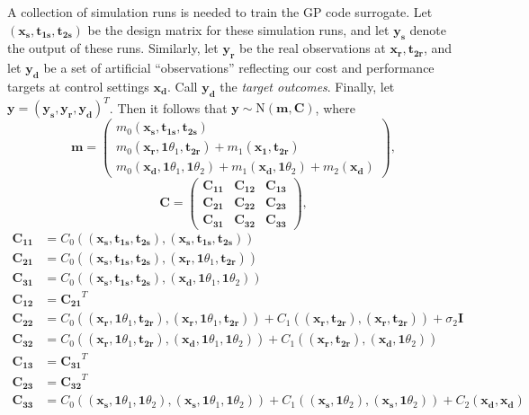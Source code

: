 \documentclass[12pt]{article}
\begin{document}
%
A collection of simulation runs is needed to train the GP code surrogate.
%
Let $(\mathbf{x_s},\mathbf{t_{1s}},\mathbf{t_{2s}})$ be the design matrix for these simulation runs, and let $\mathbf{y_s}$ denote the output of these runs.
%
Similarly, let $\mathbf{y_r}$ be the real observations at $\mathbf{x_r},\mathbf{t_{2r}}$, and let $\mathbf {y_d}$ be a set of artificial ``observations'' reflecting our cost and performance targets at control settings $\mathbf {x_d}$.
%
Call $\mathbf{y_d}$ the {\em target outcomes}.
%
Finally, let $\mathbf y = (\mathbf{y_s},\mathbf{y_r},\mathbf{y_d})^T$.
%
Then it follows that $\mathbf y\sim \mathrm{N}(\mathbf m,\mathbf C)$, where
\[
\mathbf m = \begin{pmatrix}
m_0(\mathbf{x_s},\mathbf{t_{1s}},\mathbf{t_{2s}})\\
m_0(\mathbf{x_r},\mathbf1\theta_1,\mathbf{t_{2r}}) + m_1(\mathbf{x_1},\mathbf{t_{2r}})\\
m_0(\mathbf{x_d},\mathbf1\theta_1,\mathbf1\theta_2) + m_1(\mathbf{x_d},\mathbf1\theta_2) + m_2(\mathbf{x_d})
\end{pmatrix},
\]
\[
\mathbf C = \begin{pmatrix}
\mathbf{C_{11}} & \mathbf{C_{12}} & \mathbf{C_{13}}\\
\mathbf{C_{21}} & \mathbf{C_{22}} & \mathbf{C_{23}}\\
\mathbf{C_{31}} & \mathbf{C_{32}} & \mathbf{C_{33}}
\end{pmatrix},
\]
\begin{align*}
\mathbf{C_{11}}&=C_0\left((\mathbf{x_s},\mathbf{t_{1s}},\mathbf{t_{2s}}),(\mathbf{x_s},\mathbf{t_{1s}},\mathbf{t_{2s}})\right)\\
\mathbf{C_{21}}&=C_0\left((\mathbf{x_s},\mathbf{t_{1s}},\mathbf{t_{2s}}),(\mathbf{x_r},\mathbf1\theta_1,\mathbf{t_{2r}})\right)\\
\mathbf{C_{31}}&=C_0\left((\mathbf{x_s},\mathbf{t_{1s}},\mathbf{t_{2s}}),(\mathbf{x_d},\mathbf1\theta_1,\mathbf1\theta_2)\right)\\
\mathbf{C_{12}}&=\mathbf{C_{21}}^T\\
\mathbf{C_{22}}&=C_0\left((\mathbf{x_r},\mathbf1\theta_1,\mathbf{t_{2r}}),(\mathbf{x_r},\mathbf1\theta_1,\mathbf{t_{2r}})\right) + C_1\left( (\mathbf{x_r},\mathbf{t_{2r}}),(\mathbf{x_r},\mathbf{t_{2r}}) \right) + \sigma_2 \mathbf I\\
\mathbf{C_{32}}&=C_0\left((\mathbf{x_r},\mathbf1\theta_1,\mathbf{t_{2r}}),(\mathbf{x_d},\mathbf1\theta_1,\mathbf1\theta_2)\right) + C_1\left( (\mathbf{x_r},\mathbf{t_{2r}}),(\mathbf{x_d},\mathbf1\theta_2) \right)\\
\mathbf{C_{13}}&=\mathbf{C_{31}}^T\\
\mathbf{C_{23}}&=\mathbf{C_{32}}^T\\
\mathbf{C_{33}}&=C_0\left((\mathbf{x_s},\mathbf1\theta_1,\mathbf1\theta_2),(\mathbf{x_s},\mathbf1\theta_1,\mathbf1\theta_2)\right) + C_1\left( (\mathbf{x_s},\mathbf1\theta_2),(\mathbf{x_s},\mathbf1\theta_2) \right) + C_2(\mathbf{x_d},\mathbf{x_d})
\end{align*}
\end{document}
